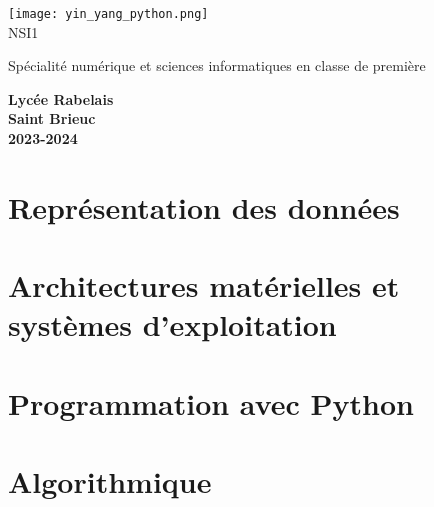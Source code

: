 \documentclass[10pt,a4paper]{nsibook}
\begin{document}
\begin{titlepage}
    \begin{center}
        \texttt{[image: yin\_yang\_python.png]}\\[2em]

        {\bigtitlefont \LARGE\color{gray} NSI1\\}

        {\titlefont\Large\color{gray} Spécialité numérique et sciences informatiques en classe de première\\[2em]}

        {\color{gray}\textbf{Lycée Rabelais\\ Saint Brieuc\\ 2023-2024}}
    \end{center}
\end{titlepage}
\part{Représentation des données}





\part{Architectures matérielles et \\systèmes d'exploitation}



\part{Programmation avec Python}




\part{Algorithmique}



\end{document}
